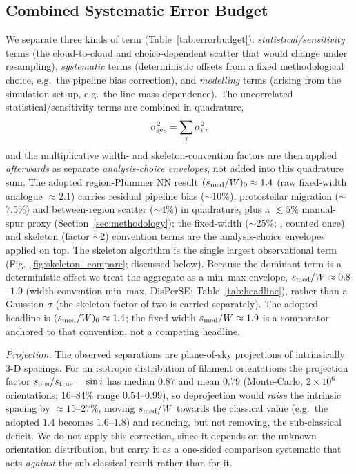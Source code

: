 \documentclass[usenatbib,twoside,twocolumn]{mnras}
\begin{document}
\subsection{Combined Systematic Error Budget}
\label{sec:error_budget}

We separate three kinds of term (Table~\ref{tab:errorbudget}): \emph{statistical/sensitivity} terms (the cloud-to-cloud and choice-dependent scatter that would change under resampling), \emph{systematic} terms (deterministic offsets from a fixed methodological choice, e.g.\ the pipeline bias correction), and \emph{modelling} terms (arising from the simulation set-up, e.g.\ the line-mass dependence). The uncorrelated statistical/sensitivity terms are combined in quadrature,
\begin{equation}
\sigma_{\rm sys}^2=\sum_i\sigma_i^2,
\label{eq:quadrature}
\end{equation}
and the multiplicative width- and skeleton-convention factors are then applied \emph{afterwards} as separate \emph{analysis-choice envelopes}, not added into this quadrature sum. The adopted region-Plummer NN result $(s_{\rm med}/W)_0\approx1.4$ (raw fixed-width analogue $\approx2.1$) carries residual pipeline bias ($\sim$10\%), protostellar migration ($\sim$7.5\%) and between-region scatter ($\sim$4\%) in quadrature, plus a $\lesssim5\%$ manual-spur proxy (Section~\ref{sec:methodology}); the fixed-width ($\sim$25\%; \citealt{Panopoulou2022}, counted once) and skeleton (factor $\sim$2) convention terms are the analysis-choice envelopes applied on top. The skeleton algorithm is the single largest observational term (Fig.~\ref{fig:skeleton_compare}; discussed below). Because the dominant term is a deterministic offset we treat the aggregate as a min--max envelope, $s_{\rm med}/W\approx0.8$--$1.9$ (width-convention min--max, DisPerSE; Table~\ref{tab:headline}), rather than a Gaussian $\sigma$ (the skeleton factor of two is carried separately). The adopted headline is $(s_{\rm med}/W)_0\approx1.4$; the fixed-width $s_{\rm med}/W\approx1.9$ is a comparator anchored to that convention, not a competing headline.

\emph{Projection.} The observed separations are plane-of-sky projections of intrinsically 3-D spacings. For an isotropic distribution of filament orientations the projection factor $s_{\rm obs}/s_{\rm true}=\sin i$ has median $0.87$ and mean $0.79$ (Monte-Carlo, $2\times10^6$ orientations; 16--84\% range $0.54$--$0.99$), so deprojection would \emph{raise} the intrinsic spacing by $\approx15$--$27\%$, moving $s_{\rm med}/W$ towards the classical value (e.g.\ the adopted $1.4$ becomes $1.6$--$1.8$) and reducing, but not removing, the sub-classical deficit. We do not apply this correction, since it depends on the unknown orientation distribution, but carry it as a one-sided comparison systematic that acts \emph{against} the sub-classical result rather than for it.
\end{document}
